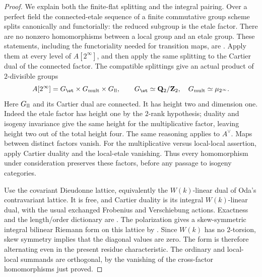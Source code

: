 \begin{proof}
We explain both the finite-flat splitting and the integral pairing.
Over a perfect field the connected-etale sequence of a finite
commutative group scheme splits canonically and functorially:
the reduced subgroup is the etale factor.  There are no nonzero
homomorphisms between a local group and an etale group.  These
statements, including the functoriality needed for transition maps,
are \cite[Lemma~4.44 and Proposition~4.45, p.~67]
{EdixhovenVanDerGeerMoonenAV}.
Apply them at every level of $A[2^\infty]$, and then apply the same
splitting to the Cartier dual of the connected factor.  The compatible
splittings give an actual product of $2$-divisible groups
\[
 A[2^\infty]=G_{\et}\times G_{\rm mult}\times G_{\rm ll},
 \qquad
 G_{\et}\simeq\mathbf Q_2/\mathbf Z_2,\quad
 G_{\rm mult}\simeq\mu_{2^\infty}.
\]
Here $G_{\rm ll}$ and its Cartier dual are connected.  It has height
two and dimension one.  Indeed the etale factor has height one by
the $2$-rank hypothesis; duality and isogeny invariance give the same
height for the multiplicative factor, leaving height two out of the
total height four.  The same reasoning applies to $A^\vee$.
Maps between distinct factors vanish.  For the multiplicative versus
local-local assertion, apply Cartier duality and the local-etale
vanishing.  Thus every homomorphism under consideration preserves
these factors, before any passage to isogeny categories.

Use the covariant Dieudonne lattice, equivalently the $W(k)$-linear
dual of Oda's contravariant lattice.  It is free, and Cartier duality
is its integral $W(k)$-linear dual, with the usual exchanged
Frobenius and Verschiebung actions.  Exactness and the length/order
dictionary are \cite[Theorem~3.14(ii)--(iii) and
Corollaries~3.15--3.16, pp.~87--88; Proposition~3.18, p.~89;
Proposition~3.22, p.~99]{Oda1969Dieudonne}.
The polarization gives a skew-symmetric integral bilinear Riemann
form on this lattice by
\cite[Propositions~1.10 and 1.12, pp.~75--76, and
Proposition~3.24(ii), pp.~100--101]{Oda1969Dieudonne}.
Since $W(k)$ has no $2$-torsion, skew symmetry implies that the
diagonal values are zero.  The form is therefore alternating even
in the present residue characteristic.  The ordinary and local-local
summands are orthogonal, by the vanishing of the cross-factor
homomorphisms just proved.


\end{proof}
